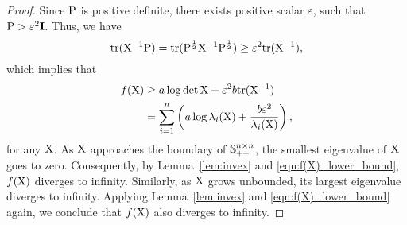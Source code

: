 \begin{proof}
    Since ${ \mathrm{P} }$ is positive definite, there exists positive scalar $\varepsilon$, such that ${ \mathrm{P} } > \varepsilon^2 \mathbf{I}$. Thus, we have
    \begin{equation}
        \mathrm{tr}({ \mathrm{X} }^{-1} { \mathrm{P} }) = \mathrm{tr}({ \mathrm{P} }^{\frac{1}{2}} { \mathrm{X} }^{-1} { \mathrm{P} }^{\frac{1}{2}}) \geq \varepsilon^2 \mathrm{tr}({ \mathrm{X} }^{-1}),
    \end{equation}
    which implies that
    \begin{equation}\label{eqn:f(X)_lower_bound}
    \begin{split}
        f(\mxX) &\geq a \log\det \mxX + \varepsilon^2 b \trace(\mxX^{-1})
        \\ &
        = \sum_{i=1}^n \left( a \log \lambda_i(\mxX) + \frac{b \varepsilon^2}{\lambda_i(\mxX)} \right),
    \end{split}
    \end{equation}
    for any ${ \mathrm{X} }$.
    As ${ \mathrm{X} }$ approaches the boundary of ${\mathbb{S}}_{++}^{n \times n}$, the smallest eigenvalue of ${ \mathrm{X} }$ goes to zero. Consequently, by Lemma~\ref{lem:invex} and \eqref{eqn:f(X)_lower_bound}, $f({ \mathrm{X} })$ diverges to infinity. Similarly, as ${ \mathrm{X} }$ grows unbounded, its largest eigenvalue diverges to infinity. Applying Lemma~\ref{lem:invex} and \eqref{eqn:f(X)_lower_bound} again, we conclude that $f({ \mathrm{X} })$ also diverges to infinity.

\end{proof}
